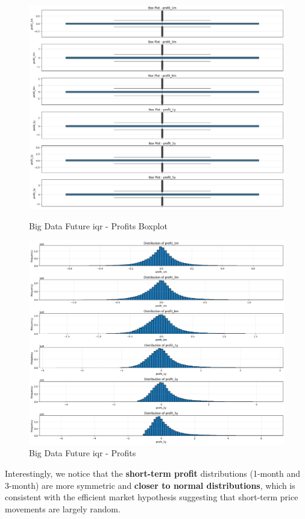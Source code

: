 \documentclass[11pt,english,a4paper,hidelinks]{book}
\begin{document}
\begin{figure}[H]
    \centering
    \begin{minipage}{0.48\textwidth}
        \centering
        \includegraphics[width=0.8\linewidth]{images/code/descriptive analysis/distributions/Big Data future IQR - Profits Boxplot.png}
        \caption{Big Data Future \acrshort{iqr} - Profits Boxplot}
        \label{fig:big_data_future_iqr_profits_boxplot}
    \end{minipage}\hfill
    \begin{minipage}{0.48\textwidth}
        \centering
        \includegraphics[width=0.8\linewidth]{images/code/descriptive analysis/distributions/Big Data Future IQR - Profits.png}
        \caption{Big Data Future \acrshort{iqr} - Profits}
        \label{fig:big_data_future_iqr_profits_iqr}
    \end{minipage}
\end{figure}


\vspace{0.5cm}
\noindent Interestingly, we notice that the \textbf{short-term profit} distributions (1-month and 3-month) are more symmetric and \textbf{closer to normal distributions}, which is consistent with the efficient market hypothesis suggesting that short-term price movements are largely random. 
\end{document}

